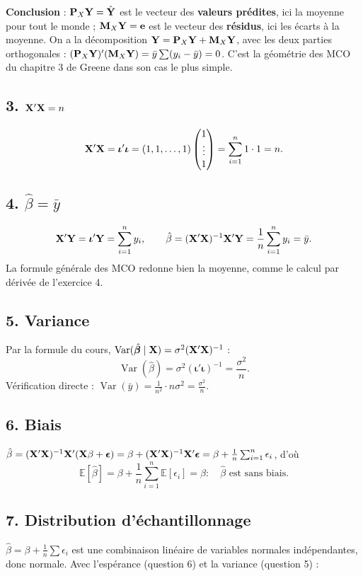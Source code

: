 \documentclass[11pt,a4paper]{article}
\newcommand{\vi}{\bm{\iota}}
\newcommand{\veps}{\bm{\epsilon}}\newcommand{\ve}{\mathbf{e}}\newcommand{\vx}{\mathbf{x}}
\newcommand{\Pm}{\mathbf{P}}\newcommand{\Mm}{\mathbf{M}}
\newcommand{\E}{\mathbb{E}}\newcommand{\Var}{\operatorname{Var}}\newcommand{\Cov}{\operatorname{Cov}}
\newcommand{\sumi}{\sum_{i=1}^{n}}
\begin{document}
\begin{reponse}
\textbf{Conclusion} : $\Pm_X\vY=\hat{\vY}$ est le vecteur des \textbf{valeurs prédites}, ici la moyenne pour tout le monde ; $\Mm_X\vY=\ve$ est le vecteur des \textbf{résidus}, ici les écarts à la moyenne. On a la décomposition $\vY=\Pm_X\vY+\Mm_X\vY$, avec les deux parties orthogonales : $(\Pm_X\vY)'(\Mm_X\vY)=\bar y\sum(y_i-\bar y)=0$. C'est la géométrie des MCO du chapitre 3 de Greene dans son cas le plus simple.
\end{reponse}

\subsection*{3. $\mathbf{X}'\mathbf{X}=n$}
\[
\vX'\vX=\vi'\vi=(1,1,\dots,1)\begin{pmatrix}1\\\vdots\\1\end{pmatrix}=\sumi1\cdot1=n .
\]

\subsection*{4. $\hat\beta=\bar y$}
\[
\vX'\vY=\vi'\vY=\sumi y_i,
\qquad
\hat\beta=(\vX'\vX)^{-1}\vX'\vY=\frac1n\sumi y_i=\bar y .
\]
La formule générale des MCO redonne bien la moyenne, comme le calcul par dérivée de l'exercice 4.

\subsection*{5. Variance}
Par la formule du cours, $\Var(\hat{\bm\beta}\mid\vX)=\sigma^2(\vX'\vX)^{-1}$ :
\[
\Var(\hat\beta)=\sigma^2(\vi'\vi)^{-1}=\frac{\sigma^2}{n}.
\]
Vérification directe : $\Var(\bar y)=\frac1{n^2}\cdot n\sigma^2=\frac{\sigma^2}n$.

\subsection*{6. Biais}
$\hat\beta=(\vX'\vX)^{-1}\vX'(\vX\beta+\veps)=\beta+(\vX'\vX)^{-1}\vX'\veps=\beta+\frac1n\sumi\epsilon_i$, d'où
\[
\E[\hat\beta]=\beta+\frac1n\sumi\E[\epsilon_i]=\beta :\quad \hat\beta \text{ est sans biais.}
\]

\subsection*{7. Distribution d'échantillonnage}
$\hat\beta=\beta+\frac1n\sum\epsilon_i$ est une combinaison linéaire de variables normales indépendantes, donc normale. Avec l'espérance (question 6) et la variance (question 5) :
\end{document}
